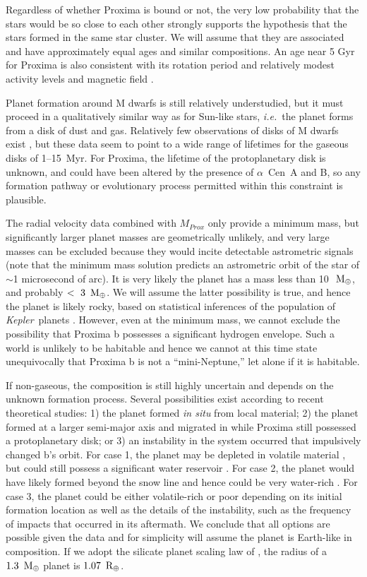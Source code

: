 \documentclass[preprint,12pt]{aastex}
\def\mearth{{\rm\,M_\oplus}}
\def\rearth{{\rm\,R_\oplus}}
\def\eg{{\it e.g.\ }}
\def\ie{{\it i.e.\ }}
\def\acen{{$\alpha$~Cen}}
\def\kepler{{\it Kepler}}
\begin{document}
Regardless of whether Proxima is bound or not, the very low
probability that the stars would be so close to each other strongly
supports the hypothesis that the stars formed in the same star
cluster. We will assume that they are associated and have
approximately equal ages and similar compositions. An age near 5 Gyr
for Proxima is also consistent with its rotation period and relatively
modest activity levels and magnetic field \citep{ReinersBasri08}. 

Planet formation around M dwarfs is still relatively understudied, but
it must proceed in a qualitatively similar way as for Sun-like stars,
\ie the planet forms from a disk of dust and gas. Relatively few
observations of disks of M dwarfs exist
\citep[\eg][]{Hernandez07,WilliamsCieza11,Luhman12,Downes15}, but
these data seem to point to a wide range of lifetimes for the gaseous
disks of 1--15~Myr. For Proxima, the lifetime of the protoplanetary
disk is unknown, and could have been altered by the presence of
\acen~A and B, so any formation pathway or evolutionary process
permitted within this constraint is plausible.

The radial velocity data combined with $M_{Prox}$ only provide a
minimum mass, but significantly larger planet masses are geometrically
unlikely, and very large masses can be excluded because they would
incite detectable astrometric signals (note that the minimum mass
solution predicts an astrometric orbit of the star of $\sim$1
microsecond of arc). It is very likely the planet has a mass less than
10~$\mearth$, and probably $<~3~\mearth$. We will assume the latter
possibility is true, and hence the planet is likely rocky, based on
statistical inferences of the population of \kepler~planets
\citep{WeissMarcy14,Rogers15}. However, even at the minimum mass, we
cannot exclude the possibility that Proxima b possesses a significant
hydrogen envelope. Such a world is unlikely to be habitable \citep[but
  see][]{PierrehumbertGaidos11} and hence we cannot at this time state
unequivocally that Proxima b is not a ``mini-Neptune,'' let alone if
it is habitable.

If non-gaseous, the composition is still highly uncertain and depends
on the unknown formation process. Several possibilities exist
according to recent theoretical studies: 1) the planet formed {\it in
  situ} from local material; 2) the planet formed at a larger
semi-major axis and migrated in while Proxima still possessed a
protoplanetary disk; or 3) an instability in the system occurred that
impulsively changed b's orbit. For case 1, the planet may be depleted
in volatile material \citep{Raymond07,Lissauer07}, but could still
possess a significant water reservoir \citep{Ciesla15,Mulders15}. For case 2,
the planet would have likely formed beyond the snow line and hence
could be very water-rich \citep{CarterBond12}. For case 3, the planet
could be either volatile-rich or poor depending on its initial
formation location as well as the details of the instability, such as
the frequency of impacts that occurred in its aftermath. We conclude
that all options are possible given the data and for simplicity will
assume the planet is Earth-like in composition. If we adopt the
silicate planet scaling law of \cite{Sotin07}, the radius of a
$1.3~\mearth$ planet is $1.07~\rearth$.
\end{document}
